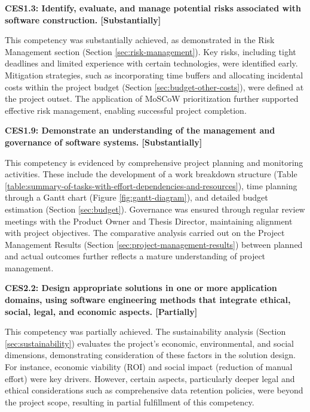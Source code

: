 \textbf{CES1.3: Identify, evaluate, and manage potential risks associated with software construction. [Substantially]}

This competency was substantially achieved, as demonstrated in the Risk Management section (Section \ref{sec:risk-management}). Key risks, including tight deadlines and limited experience with certain technologies, were identified early. Mitigation strategies, such as incorporating time buffers and allocating incidental costs within the project budget (Section \ref{sec:budget-other-costs}), were defined at the project outset. The application of MoSCoW prioritization further supported effective risk management, enabling successful project completion.

\textbf{CES1.9: Demonstrate an understanding of the management and governance of software systems. [Substantially]}

This competency is evidenced by comprehensive project planning and monitoring activities. These include the development of a work breakdown structure (Table \ref{table:summary-of-tasks-with-effort-dependencies-and-resources}), time planning through a Gantt chart (Figure \ref{fig:gantt-diagram}), and detailed budget estimation (Section \ref{sec:budget}). Governance was ensured through regular review meetings with the Product Owner and Thesis Director, maintaining alignment with project objectives. The comparative analysis carried out on the Project Management Results (Section \ref{sec:project-management-results}) between planned and actual outcomes further reflects a mature understanding of project management.

\textbf{CES2.2: Design appropriate solutions in one or more application domains, using software engineering methods that integrate ethical, social, legal, and economic aspects. [Partially]}

This competency was partially achieved. The sustainability analysis (Section \ref{sec:sustainability}) evaluates the project's economic, environmental, and social dimensions, demonstrating consideration of these factors in the solution design. For instance, economic viability (ROI) and social impact (reduction of manual effort) were key drivers. However, certain aspects, particularly deeper legal and ethical considerations such as comprehensive data retention policies, were beyond the project scope, resulting in partial fulfillment of this competency.

